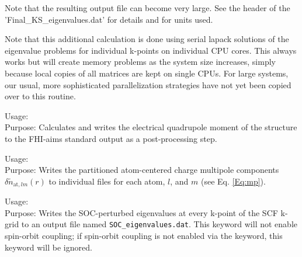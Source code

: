 Note that the resulting output file can become very large. See the header of the
'Final\_KS\_eigenvalues.dat' for details and for units used.

Note that this additional calculation is done using serial lapack solutions
of the eigenvalue problems for individual k-points on individual CPU cores.
This always works but will create memory problems as the system size increases,
simply because local copies of all matrices are kept on single CPUs. For large
systems, our usual, more sophisticated parallelization strategies have not yet
been copied over to this routine.

{
  \noindent
  Usage:   \\[1.0ex]
  Purpose: Calculates and writes the electrical quadrupole moment of the
    structure to the FHI-aims standard output as a post-processing step. \\[1.0ex]
}

{
  \noindent
  Usage:   \\[1.0ex]
  Purpose: Writes the partitioned atom-centered charge multipole
    components $\delta\tilde{n}_{\text{at},lm}(r)$ to individual files
    for each atom, $l$, and $m$ (see Eq. \ref{Eq:mp}). \\[1.0ex]
}

{
  \noindent
  Usage:   \\[1.0ex]
  Purpose:  Writes the SOC-perturbed eigenvalues at every k-point of the SCF k-grid
    to an output file named \texttt{SOC\_eigenvalues.dat}.  This keyword will not enable
    spin-orbit coupling;  if spin-orbit coupling is not enabled via the
     keyword, this keyword will be ignored.  \\[1.0ex]
}

